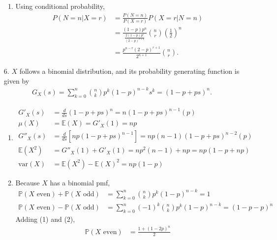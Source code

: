 \documentclass[a4paper,12pt]{article}
\begin{document}
\begin{enumerate}
\begin{enumerate}
            \item
                Using conditional probability,
                \begin{align*}
                    P(N = n | X = r) &= \frac{P(N = n)}{P(X = r)} P(X = r | N = n) \\
                    &= \frac{(1 - p) p^n}{\frac{2(1 - p)p^r}{(2 - p)^{r + 1}}} \binom{n}{r} \left( \frac{1}{2} \right)^n \\
                    &= \frac{p^{n - r} (2 - p)^{r + 1}}{2^{n + 1}} \binom{n}{r}.
                \end{align*}

        \end{enumerate}

    \item[6.] 
        $X$ follows a binomial distribution, and its probability generating function is given by
        \begin{align*}
            G_X(s) = \sum_{k = 0}^{n} \binom{n}{k} p^k (1 - p)^{n - k} s^k = (1 - p + ps)^n.
        \end{align*}
        \begin{enumerate}
            \item
                \begin{align*}
                    G'_X(s) &= \frac{d}{ds} (1 - p + ps)^n = n(1 - p + ps)^{n - 1} (p) \\
                    \mu(X) &= \mathbb{E}(X) = G'_X(1) = np \\
                    G''_X(s) &= \frac{d}{ds} [np (1 - p + ps)^{n - 1}] = np(n - 1) (1 - p + ps)^{n - 2} (p) \\
                    \mathbb{E}(X^2) &= G''_X(1) + G'_X(1) = np^2(n - 1) + np = np(1 - p + np) \\ 
                    \text{var}(X) &= \mathbb{E}(X^2) - \mathbb{E}(X)^2 = np(1 - p)
                \end{align*}

            \item Because $X$ has a binomial pmf,
                \begin{align}
                    \mathbb{P}(X \text{ even}) + \mathbb{P}(X \text{ odd}) &= \sum_{k = 0}^{n} \binom{n}{k} p^k (1 - p)^{n - k} = 1 \\
                    \mathbb{P}(X \text{ even}) - \mathbb{P}(X \text{ odd}) &= \sum_{k = 0}^{n} (-1)^k \binom{n}{k} p^k (1 - p)^{n - k} = (1 - p - p)^n
                \end{align}
                Adding (1) and (2),
                \begin{align*}
                    \mathbb{P}(X \text{ even}) &= \frac{1 + (1 - 2p)^n}{2}
                \end{align*}


\end{enumerate}
\end{enumerate}
\end{document}
